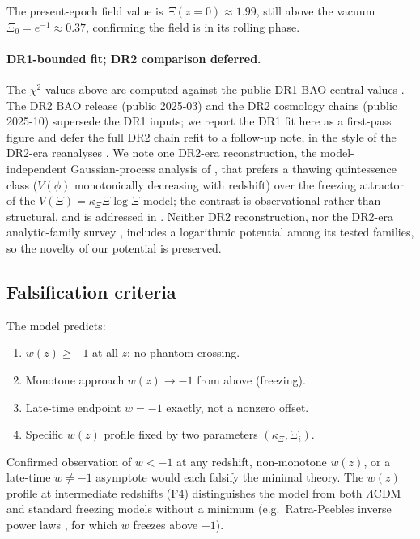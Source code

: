 \documentclass[11pt,reqno]{amsart}
\theoremstyle{plain}
\theoremstyle{definition}
\theoremstyle{remark}
\begin{document}
The present-epoch field value is $\Xi(z=0)\approx 1.99$, still above the
vacuum $\Xi_0=e^{-1}\approx 0.37$, confirming the field is in its rolling phase.

\paragraph{DR1-bounded fit; DR2 comparison deferred.}
The $\chi^{2}$ values above are computed against the public DR1 BAO central
values \cite{DESI2024BAO,DESI2024VI}. The DR2 BAO release
\cite{DESI2025DR2} (public 2025-03) and the DR2 cosmology chains (public
2025-10) supersede the DR1 inputs; we report the DR1 fit here as a
first-pass figure and defer the full DR2 chain refit to a follow-up note,
in the style of the DR2-era reanalyses \cite{Brisbane2025,Bhattacharya2025Forecast}.
We note one DR2-era reconstruction, the model-independent Gaussian-process
analysis of \cite{Wang2026QReconstruction}, that prefers a thawing
quintessence class ($V(\phi)$ monotonically decreasing with redshift) over
the freezing attractor of the $V(\Xi)=\kappa_{\Xi}\Xi\log\Xi$ model; the
contrast is observational rather than structural, and is addressed in
\cite{Turyshev2026Review}. Neither DR2 reconstruction, nor the
DR2-era analytic-family survey \cite{Adil2026Analytic}, includes a
logarithmic potential among its tested families, so the novelty of our
potential is preserved.

\subsection{Falsification criteria}

The model predicts:
\begin{enumerate}
  \item[(F1)] $w(z)\ge-1$ at all $z$: no phantom crossing.
  \item[(F2)] Monotone approach $w(z)\to-1$ from above (freezing).
  \item[(F3)] Late-time endpoint $w=-1$ exactly, not a nonzero offset.
  \item[(F4)] Specific $w(z)$ profile fixed by two parameters $(\kappa_\Xi,\Xi_i)$.
\end{enumerate}
Confirmed observation of $w<-1$ at any redshift, non-monotone $w(z)$, or a late-time
$w\neq-1$ asymptote would each falsify the minimal theory. The $w(z)$ profile at
intermediate redshifts (F4) distinguishes the model from both $\Lambda$CDM and
standard freezing models without a minimum (e.g.\ Ratra-Peebles inverse power
laws \cite{RatraPeebles1988}, for which $w$ freezes above $-1$).
\end{document}

